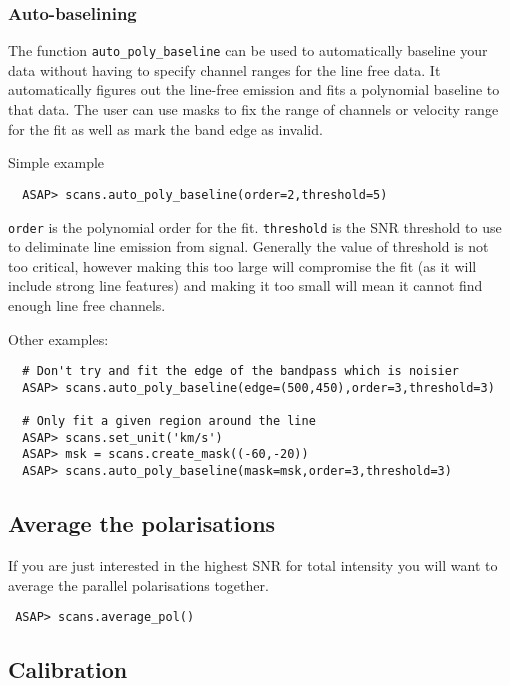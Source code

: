 \documentclass[11pt]{article}
\newcommand{\cmd}[1]{{\tt #1}}
\begin{document}
\subsubsection{Auto-baselining}

The function \cmd{auto\_poly\_baseline} can be used to automatically
baseline your data without having to specify channel ranges for the
line free data. It automatically figures out the line-free emission
and fits a polynomial baseline to that data. The user can use masks to
fix the range of channels or velocity range for the fit as well as
mark the band edge as invalid.

Simple example

\begin{verbatim}
  ASAP> scans.auto_poly_baseline(order=2,threshold=5)
\end{verbatim}

\cmd{order} is the polynomial order for the fit. \cmd{threshold} is
the SNR threshold to use to deliminate line emission from
signal. Generally the value of threshold is not too critical, however
making this too large will compromise the fit (as it will include
strong line features) and making it too small will mean it cannot find
enough line free channels.


Other examples:

\begin{verbatim}
  # Don't try and fit the edge of the bandpass which is noisier
  ASAP> scans.auto_poly_baseline(edge=(500,450),order=3,threshold=3)

  # Only fit a given region around the line
  ASAP> scans.set_unit('km/s')
  ASAP> msk = scans.create_mask((-60,-20))
  ASAP> scans.auto_poly_baseline(mask=msk,order=3,threshold=3)

\end{verbatim}

\subsection{Average the polarisations}

If you are just interested in the highest SNR for total intensity you
will want to average the parallel polarisations together.

\begin{verbatim}
 ASAP> scans.average_pol()
\end{verbatim}

\subsection{Calibration}
\end{document}
